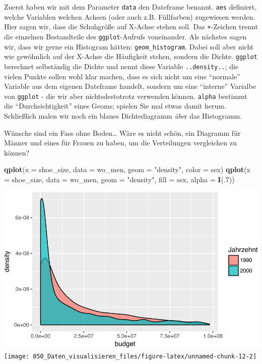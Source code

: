 \documentclass[12pt,]{book}
\newenvironment{Shaded}{\begin{snugshade}}{\end{snugshade}}
\newcommand{\KeywordTok}[1]{\textcolor[rgb]{0.13,0.29,0.53}{\textbf{{#1}}}}
\newcommand{\DataTypeTok}[1]{\textcolor[rgb]{0.13,0.29,0.53}{{#1}}}
\newcommand{\DecValTok}[1]{\textcolor[rgb]{0.00,0.00,0.81}{{#1}}}
\newcommand{\StringTok}[1]{\textcolor[rgb]{0.31,0.60,0.02}{{#1}}}
\newcommand{\NormalTok}[1]{{#1}}
\begin{document}
Zuerst haben wir mit dem Parameter \texttt{data} den Dateframe benannt.
\texttt{aes} definiert, welche Variablen welchen Achsen (oder auch z.B.
Füllfarben) zugewiesen werden. Hier sagen wir, dass die Schuhgröße auf
X-Achse stehen soll. Das \texttt{+}-Zeichen trennt die einzelnen
Bestandteile des \texttt{ggplot}-Aufrufs voneinander. Als nächstes sagen
wir, dass wir gerne ein Histogram hätten: \texttt{geom\_histogram}.
Dabei soll aber nicht wie gewöhnlich auf der X-Achse die Häufigkeit
stehen, sondern die Dichte. \texttt{ggplot} berechnet selbständig die
Dichte und nennt diese Variable \texttt{..density..}; die vielen Punkte
sollen wohl klar machen, dass es sich nicht um eine ``normale'' Variable
aus dem eigenen Dateframe handelt, sondern um eine ``interne'' Varialbe
von \texttt{ggplot} - die wir aber nichtsdestotrotz verwenden können.
\texttt{alpha} bestimmt die ``Durchsichtigkeit'' eines Geoms; spielen
Sie mal etwas damit herum. Schließlich malen wir noch ein blaues
Dichtediagramm \emph{übe}r das Histogramm.

Wünsche sind ein Fass ohne Boden\ldots{} Wäre es nicht schön, ein
Diagramm für Männer und eines für Frauen zu haben, um die Verteilungen
vergleichen zu können?

\begin{Shaded}
\begin{Highlighting}[]
\KeywordTok{qplot}\NormalTok{(}\DataTypeTok{x =} \NormalTok{shoe_size, }\DataTypeTok{data =} \NormalTok{wo_men, }\DataTypeTok{geom =} \StringTok{"density"}\NormalTok{, }\DataTypeTok{color =} \NormalTok{sex)}
\KeywordTok{qplot}\NormalTok{(}\DataTypeTok{x =} \NormalTok{shoe_size, }\DataTypeTok{data =} \NormalTok{wo_men, }\DataTypeTok{geom =} \StringTok{"density"}\NormalTok{, }\DataTypeTok{fill =} \NormalTok{sex, }\DataTypeTok{alpha =} \KeywordTok{I}\NormalTok{(.}\DecValTok{7}\NormalTok{))}
\end{Highlighting}
\end{Shaded}

\begin{center}\includegraphics[width=0.7\linewidth]{050_Daten_visualisieren_files/figure-latex/unnamed-chunk-12-1} \texttt{[image: 050\_Daten\_visualisieren\_files/figure-latex/unnamed-chunk-12-2]} \end{center}
\end{document}
